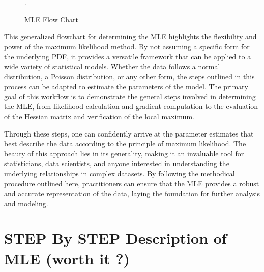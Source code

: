 \documentclass[
  12 pt,
  a4paper,
]{book}
\numberwithin{equation}{section}
\theoremstyle{plain}      %
\theoremstyle{definition} %
\theoremstyle{remark}     %
\theoremstyle{note}         %
\begin{document}
\begin{figure}[htbp]
{
}
\caption{MLE Flow Chart}.
\label{fig:MLE_Flow-diagram}
\end{figure}

\newpage

This generalized flowchart for determining the MLE highlights the
flexibility and power of the maximum likelihood method. By not assuming
a specific form for the underlying PDF, it provides a versatile
framework that can be applied to a wide variety of statistical models.
Whether the data follows a normal distribution, a Poisson distribution,
or any other form, the steps outlined in this process can be adapted to
estimate the parameters of the model. The primary goal of this workflow
is to demonstrate the general steps involved in determining the MLE,
from likelihood calculation and gradient computation to the evaluation
of the Hessian matrix and verification of the local maximum.

Through these steps, one can confidently arrive at the parameter
estimates that best describe the data according to the principle of
maximum likelihood. The beauty of this approach lies in its generality,
making it an invaluable tool for statisticians, data scientists, and
anyone interested in understanding the underlying relationships in
complex datasets. By following the methodical procedure outlined here,
practitioners can ensure that the MLE provides a robust and accurate
representation of the data, laying the foundation for further analysis
and modeling.

\hypertarget{step-by-step-description-of-mle-worth-it}{%
\section{STEP By STEP Description of MLE (worth it
?)}\label{step-by-step-description-of-mle-worth-it}}
\end{document}
